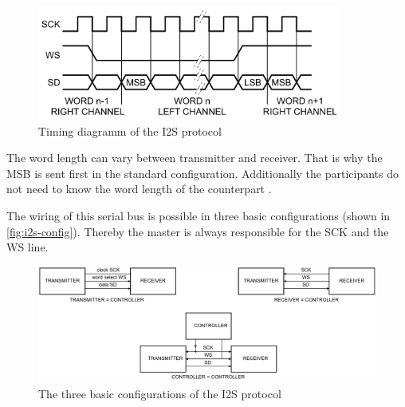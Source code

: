 \begin{figure}[!h]
    \centering
    \includegraphics[width=10cm]{img/i2s_timing.png}
    \caption{Timing diagramm of the \ac{I2S} protocol \cite{nxp_i2s}}
    \label{fig:i2s-timing}
\end{figure}

The word length can vary between transmitter and receiver. That is why the \ac{MSB} is sent first in the standard 
configuration. Additionally the participants do not need to know the word length of the counterpart \cite{nxp_i2s}.

The wiring of this serial bus is possible in three basic configurations (shown in \autoref{fig:i2s-config}).
Thereby the master is always responsible for the SCK and the WS line.

\begin{figure}[!h]
    \centering
    \includegraphics[width=14cm]{img/i2s_config.png}
    \caption{The three basic configurations of the \ac{I2S} protocol \cite{nxp_i2s}}
    \label{fig:i2s-config}
\end{figure}

